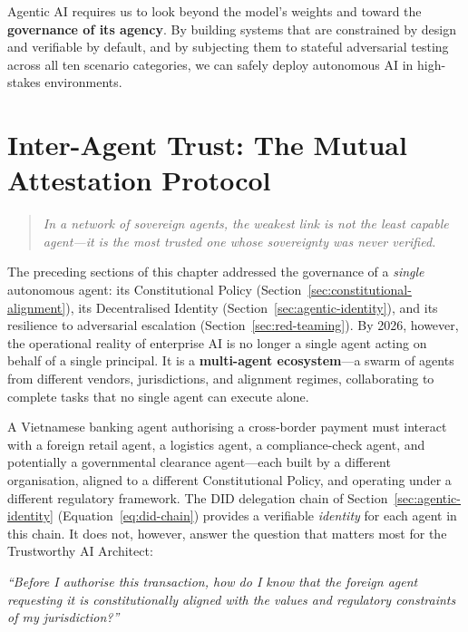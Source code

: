 Agentic AI requires us to look beyond the model's weights and toward the \textbf{governance of its agency}. By building systems that are constrained by design and verifiable by default, and by subjecting them to stateful adversarial testing across all ten scenario categories, we can safely deploy autonomous AI in high-stakes environments.


\section{Inter-Agent Trust: The Mutual Attestation Protocol}
\label{sec:inter-agent-trust}

\begin{quote}
\itshape
In a network of sovereign agents, the weakest link is not the
least capable agent---it is the most trusted one whose
sovereignty was never verified.
\end{quote}

The preceding sections of this chapter addressed the governance of a
\emph{single} autonomous agent: its Constitutional Policy
(Section~\ref{sec:constitutional-alignment}), its Decentralised Identity
(Section~\ref{sec:agentic-identity}), and its resilience to adversarial
escalation (Section~\ref{sec:red-teaming}).  By 2026, however, the
operational reality of enterprise AI is no longer a single agent acting on
behalf of a single principal.  It is a \textbf{multi-agent ecosystem}---a
swarm of agents from different vendors, jurisdictions, and alignment
regimes, collaborating to complete tasks that no single agent can execute
alone.

A Vietnamese banking agent authorising a cross-border payment must interact
with a foreign retail agent, a logistics agent, a compliance-check agent,
and potentially a governmental clearance agent---each built by a different
organisation, aligned to a different Constitutional Policy, and operating
under a different regulatory framework.  The DID delegation chain of
Section~\ref{sec:agentic-identity} (Equation~\ref{eq:did-chain}) provides
a verifiable \emph{identity} for each agent in this chain.  It does not,
however, answer the question that matters most for the Trustworthy AI
Architect:

\begin{center}
\itshape
``Before I authorise this transaction, how do I know that the foreign
agent requesting it is constitutionally aligned with the values and
regulatory constraints of my jurisdiction?''
\end{center}


